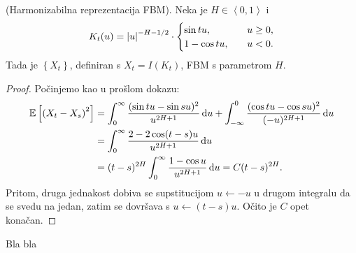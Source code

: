 \documentclass[main.tex]{subfiles}
\begin{document}
\begin{teorem} (Harmonizabilna reprezentacija FBM).
	Neka je \( H \in \left\langle0,1\right\rangle \) i
	\begin{equation}
		K_t(u) =
		\left| {u} \right|^{-H-1/2} \cdot \begin{cases}
			\sin tu, \quad   & u \ge 0, \\
			1-\cos tu, \quad & u < 0.
		\end{cases}
	\end{equation}
	Tada je \( \left\{ X_t \right\} \),
	definiran s \( X_t = I(K_t) \), FBM s parametrom \( H \).
\end{teorem}

\begin{proof}
	Počinjemo kao u prošlom dokazu:
	\begin{align}
		\mathbb{E} \left[ \left( X_t-X_s \right)^2 \right] & =
		\int_0^\infty \frac{(\sin tu - \sin su)^2}{u^{2H+1}} \,\mathrm d u +
		\int_{-\infty}^0 \frac{(\cos tu - \cos su)^2}{(-u)^{2H+1}} \,\mathrm d u                                  \\
		                                           & = \int_0^\infty \frac{2-2\cos(t-s)u}{u^{2H+1}} \,\mathrm d u \\ &=  (t-s)^{2H}\int_0^\infty \frac{1-\cos u}{u^{2H+1}} \,\mathrm d u =C(t-s)^{2H}.
	\end{align}
	Pritom, druga jednakost dobiva se supstitucijom \( u \leftarrow -u \)
	u drugom integralu da se svedu na jedan, zatim se
	dovršava s \( u \leftarrow (t-s)u \). Očito je \( C \) opet konačan.
\end{proof}

\begin{komentar}
	Bla bla
\end{komentar}
\end{document}
